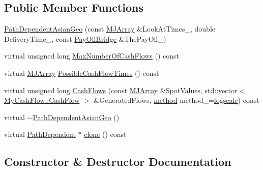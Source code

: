 \subsection*{Public Member Functions}
\begin{DoxyCompactItemize}
\item 
\hyperlink{classPathDependentAsianGeo_a1089c6f9983fe395bd5d0864a1503e12}{Path\+Dependent\+Asian\+Geo} (const \hyperlink{classMJArray}{M\+J\+Array} \&Look\+At\+Times\+\_\+, double Delivery\+Time\+\_\+, const \hyperlink{classPayOffBridge}{Pay\+Off\+Bridge} \&The\+Pay\+Off\+\_\+)
\item 
virtual unsigned long \hyperlink{classPathDependentAsianGeo_a5c499689dd6591991d48883b3116ceb6}{Max\+Number\+Of\+Cash\+Flows} () const
\item 
virtual \hyperlink{classMJArray}{M\+J\+Array} \hyperlink{classPathDependentAsianGeo_ad8112de6219127c31de11d5774e80374}{Possible\+Cash\+Flow\+Times} () const
\item 
virtual unsigned long \hyperlink{classPathDependentAsianGeo_a8eb2e111e62e2dae653a9146d2baa2ee}{Cash\+Flows} (const \hyperlink{classMJArray}{M\+J\+Array} \&Spot\+Values, std\+::vector$<$ \hyperlink{classMyCashFlow_1_1CashFlow}{My\+Cash\+Flow\+::\+Cash\+Flow} $>$ \&Generated\+Flows, \hyperlink{PathDependent_8h_abed946c62f140eb7ff2ac742e6ad9497}{method} method\+\_\+=\hyperlink{PathDependent_8h_abed946c62f140eb7ff2ac742e6ad9497a064d3d3358889658ce07fe9f3191d1fd}{logscale}) const
\item 
virtual \hyperlink{classPathDependentAsianGeo_acef4f802715b8ed69258c71a7c02f1e8}{$\sim$\+Path\+Dependent\+Asian\+Geo} ()
\item 
virtual \hyperlink{classPathDependent}{Path\+Dependent} $\ast$ \hyperlink{classPathDependentAsianGeo_a2f180b3c727e6e8e8ed4e39f6a4ee839}{clone} () const
\end{DoxyCompactItemize}


\subsection{Constructor \& Destructor Documentation}
\hypertarget{classPathDependentAsianGeo_a1089c6f9983fe395bd5d0864a1503e12}{}\label{classPathDependentAsianGeo_a1089c6f9983fe395bd5d0864a1503e12} 
